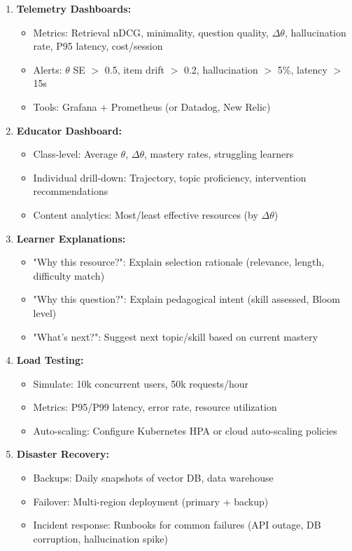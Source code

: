 \documentclass[11pt,letterpaper]{article}
\begin{document}
\begin{enumerate}
\item \textbf{Telemetry Dashboards:}
\begin{itemize}
\item Metrics: Retrieval nDCG, minimality, question quality, $\Delta\theta$, hallucination rate, P95 latency, cost/session
\item Alerts: $\theta$ SE $>$ 0.5, item drift $>$ 0.2, hallucination $>$ 5\%, latency $>$ 15s
\item Tools: Grafana + Prometheus (or Datadog, New Relic)
\end{itemize}

\item \textbf{Educator Dashboard:}
\begin{itemize}
\item Class-level: Average $\theta$, $\Delta\theta$, mastery rates, struggling learners
\item Individual drill-down: Trajectory, topic proficiency, intervention recommendations
\item Content analytics: Most/least effective resources (by $\Delta\theta$)
\end{itemize}

\item \textbf{Learner Explanations:}
\begin{itemize}
\item "Why this resource?": Explain selection rationale (relevance, length, difficulty match)
\item "Why this question?": Explain pedagogical intent (skill assessed, Bloom level)
\item "What's next?": Suggest next topic/skill based on current mastery
\end{itemize}

\item \textbf{Load Testing:}
\begin{itemize}
\item Simulate: 10k concurrent users, 50k requests/hour
\item Metrics: P95/P99 latency, error rate, resource utilization
\item Auto-scaling: Configure Kubernetes HPA or cloud auto-scaling policies
\end{itemize}

\item \textbf{Disaster Recovery:}
\begin{itemize}
\item Backups: Daily snapshots of vector DB, data warehouse
\item Failover: Multi-region deployment (primary + backup)
\item Incident response: Runbooks for common failures (API outage, DB corruption, hallucination spike)
\end{itemize}
\end{enumerate}
\end{document}
